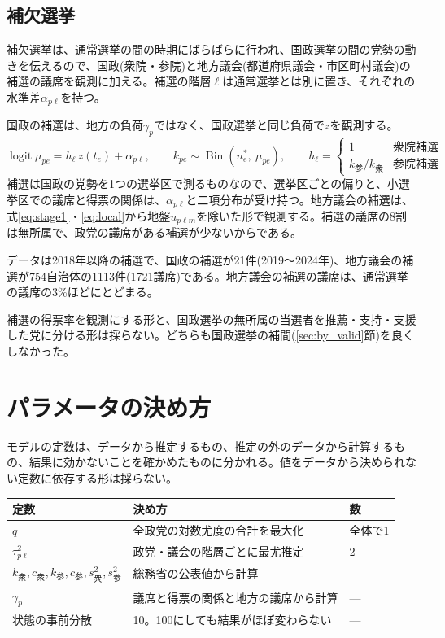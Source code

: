 \documentclass[a4paper,11pt]{ltjsarticle}
\begin{document}
\subsection{補欠選挙}
\label{sec:by}

補欠選挙は、通常選挙の間の時期にばらばらに行われ、国政選挙の間の党勢の動きを伝えるので、国政(衆院・参院)と地方議会(都道府県議会・市区町村議会)の補選の議席を観測に加える。補選の階層$\ell$は通常選挙とは別に置き、それぞれの水準差$\alpha_{p\ell}$を持つ。

国政の補選は、地方の負荷$\gamma_p$ではなく、国政選挙と同じ負荷で$z$を観測する。
\begin{equation}
  \operatorname{logit}\mu_{pe} = h_\ell\,z(t_e) + \alpha_{p\ell},\qquad k_{pe}\sim\operatorname{Bin}(n^\ast_e,\ \mu_{pe}),\qquad
  h_\ell = \begin{cases}1 & \text{衆院補選}\\ k_{\text{参}}/k_{\text{衆}} & \text{参院補選}\end{cases}
\end{equation}
補選は国政の党勢を1つの選挙区で測るものなので、選挙区ごとの偏りと、小選挙区での議席と得票の関係は、$\alpha_{p\ell}$と二項分布が受け持つ。地方議会の補選は、式\eqref{eq:stage1}・\eqref{eq:local}から地盤$u_{p\ell m}$を除いた形で観測する。補選の議席の8割は無所属で、政党の議席がある補選が少ないからである。

データは2018年以降の補選で、国政の補選が21件(2019〜2024年)、地方議会の補選が754自治体の1113件(1721議席)である。地方議会の補選の議席は、通常選挙の議席の3\%ほどにとどまる。

補選の得票率を観測にする形と、国政選挙の無所属の当選者を推薦・支持・支援した党に分ける形は採らない。どちらも国政選挙の補間(\ref{sec:by_valid}節)を良くしなかった。

\section{パラメータの決め方}

モデルの定数は、データから推定するもの、推定の外のデータから計算するもの、結果に効かないことを確かめたものに分かれる。値をデータから決められない定数に依存する形は採らない。

\begin{table}[h]
\centering
\begin{tabular}{lll}
\hline
定数 & 決め方 & 数 \\
\hline
$q$ & 全政党の対数尤度の合計を最大化 & 全体で1 \\
$\tau^2_{p\ell}$ & 政党・議会の階層ごとに最尤推定 & 2 \\
$k_{\text{衆}}, c_{\text{衆}}, k_{\text{参}}, c_{\text{参}}, s^2_{\text{衆}}, s^2_{\text{参}}$ & 総務省の公表値から計算 & --- \\
$\gamma_p$ & 議席と得票の関係と地方の議席から計算 & --- \\
状態の事前分散 & 10。100にしても結果がほぼ変わらない & --- \\
\hline
\end{tabular}
\end{table}
\end{document}
